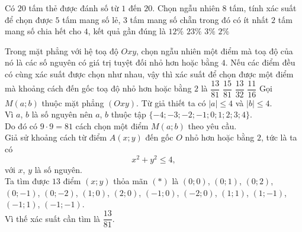 \begin{ex}%
	Có $ 20 $ tấm thẻ được đánh số từ $ 1 $ đến $ 20 $. Chọn ngẫu nhiên $ 8 $ tấm, tính xác suất để chọn được $ 5 $ tấm mang số lẻ, $ 3 $ tấm mang số chẵn trong đó có ít nhất $ 2 $ tấm mang số chia hết cho $ 4 $, kết quả gần đúng là
	\choice
	{\True $12\%$}
	{$23\%$}
	{$3\%$}
	{ $2\%$}
\end{ex}%
\begin{ex}%
 Trong mặt phẳng với hệ toạ độ $Oxy$, chọn ngẫu nhiên một điểm mà toạ độ của nó là các số nguyên có giá trị tuyệt đối nhỏ hơn hoặc bằng $4$. Nếu các điểm đều có cùng xác suất được chọn như nhau, vậy thì xác suất để chọn được một điểm mà khoảng cách đến gốc toạ độ nhỏ hơn hoặc bằng $2$ là
 \choice
  {\True $\dfrac{13}{81}$}
  {$\dfrac{15}{81}$}
  {$\dfrac{13}{32}$}
  {$\dfrac{11}{16}$}
 \loigiai
  {
  Gọi $M(a; b)$ thuộc mặt phẳng $(Oxy)$. Từ giả thiết ta có $|a|\leq 4$ và $|b|\leq 4$.\\
  Vì $a$, $b$ là số nguyên nên $a$, $b$ thuộc tập $\{-4; -3; -2; -1; 0; 1; 2; 3; 4\}$.\\
  Do đó có $9 \cdot 9=81$ cách chọn một điểm $M(a; b)$ theo yêu cầu.\\
  Giả sử khoảng cách từ điểm $A(x; y)$ đến gốc $O$ nhỏ hơn hoặc bằng $2$, tức là ta có 
  \[x^2+y^2 \leq 4, \tag{$*$}\] với $x$, $y$ là số nguyên.\\
  Ta tìm được $13$ điểm $(x;y)$ thỏa mãn $(*)$ là $(0;0)$, $(0;1)$, $(0;2)$, $(0;-1)$, $(0;-2)$, $(1;0)$, $(2;0)$, $(-1;0)$, $(-2;0)$, $(1;1)$, $(1;-1)$, $(-1;1)$, $(-1;-1)$.\\
  Vì thế xác suất cần tìm là $\dfrac{13}{81}$.
  }
\end{ex}%
